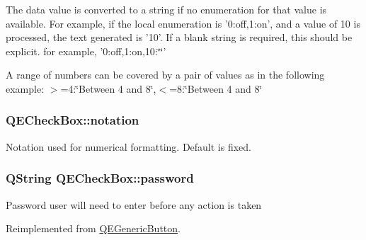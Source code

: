 The data value is converted to a string if no enumeration for that value is available. For example, if the local enumeration is '0:off,1:on', and a value of 10 is processed, the text generated is '10'. If a blank string is required, this should be explicit. for example, '0:off,1:on,10:\char`\"{}\char`\"{}'

A range of numbers can be covered by a pair of values as in the following example: $>$=4:\char`\"{}Between 4 and 8\char`\"{},$<$=8:\char`\"{}Between 4 and 8\char`\"{} \hypertarget{classQECheckBox_a2a12d710a7a113a8156f4bf3cc98e91a}{
\subsubsection[{notation}]{ QECheckBox::notation}}
\label{classQECheckBox_a2a12d710a7a113a8156f4bf3cc98e91a}
Notation used for numerical formatting. Default is fixed. \hypertarget{classQECheckBox_ab0927b9fabc924adfd3a80b427d20d76}{
\subsubsection[{password}]{\setlength{\rightskip}{0pt plus 5cm}QString QECheckBox::password}}
\label{classQECheckBox_ab0927b9fabc924adfd3a80b427d20d76}
Password user will need to enter before any action is taken 

Reimplemented from \hyperlink{classQEGenericButton}{QEGenericButton}.

